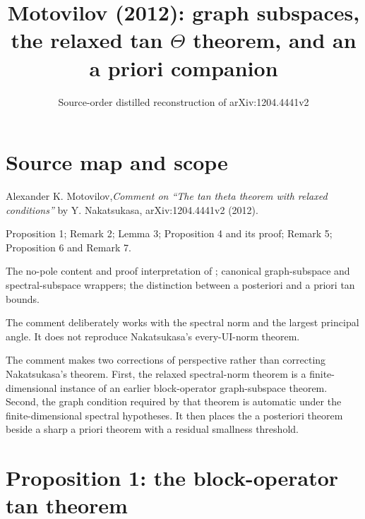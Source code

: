 
\title{Motovilov (2012): graph subspaces, the relaxed tan $\Theta$ theorem, and an a priori companion}
\author{}
\date{Source-order distilled reconstruction of arXiv:1204.4441v2}

\maketitle

\section*{Source map and scope}
\begin{sourceguide}
\item[Primary source] Alexander K. Motovilov,\linebreak \emph{Comment on ``The tan theta theorem with relaxed conditions''} by Y. Nakatsukasa, arXiv:1204.4441v2 (2012).
\item[Coverage] Proposition 1; Remark 2; Lemma 3; Proposition 4 and its proof; Remark 5; Proposition 6 and Remark 7.
\item[Formalization target] The no-pole content and proof interpretation of ; canonical graph-subspace and spectral-subspace wrappers; the distinction between a posteriori and a priori tan bounds.
\item[Norm scope] The comment deliberately works with the spectral norm and the largest principal angle. It does not reproduce Nakatsukasa's every-UI-norm theorem.
\end{sourceguide}

The comment makes two corrections of perspective rather than correcting Nakatsukasa's theorem. First, the relaxed spectral-norm theorem is a finite-dimensional instance of an earlier block-operator graph-subspace theorem. Second, the graph condition required by that theorem is automatic under the finite-dimensional spectral hypotheses. It then places the a posteriori theorem beside a sharp a priori theorem with a residual smallness threshold.

\section{Proposition 1: the block-operator tan theorem}


